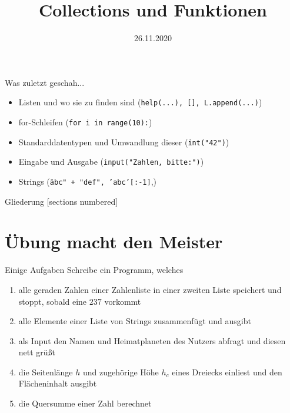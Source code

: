 



\title{Collections und Funktionen}
\date{26.11.2020}



	
\maketitle

\begin{frame}{Was zuletzt geschah...}
	\begin{itemize}
		\item Listen und wo sie zu finden sind (\texttt{help(...), [], L.append(...)})
		\item for-Schleifen (\texttt{for i in range(10):})
		\item Standarddatentypen und Umwandlung dieser (\texttt{int("42")})
		\item Eingabe und Ausgabe (\texttt{input("Zahlen, bitte:")})
		\item Strings (\texttt{\"abc" + "def", 'abc'[:-1]},)
	\end{itemize}
\end{frame}

\begin{frame}{Gliederung}
	[sections numbered]
	\tableofcontents
\end{frame}

\section{Übung macht den Meister}

\begin{frame}{Einige Aufgaben}
	Schreibe ein Programm, welches
	\begin{enumerate}
		\item alle geraden Zahlen einer Zahlenliste in einer zweiten Liste speichert und stoppt, sobald eine $237$ vorkommt
		\item alle Elemente einer Liste von Strings zusammenfügt und ausgibt
		\item als Input den Namen und Heimatplaneten des Nutzers abfragt und diesen nett grüßt
		\item die Seitenlänge $h$ und zugehörige Höhe $h_c$ eines Dreiecks einliest und den Flächeninhalt ausgibt
		\item die Quersumme einer Zahl berechnet
	\end{enumerate}
\end{frame}

